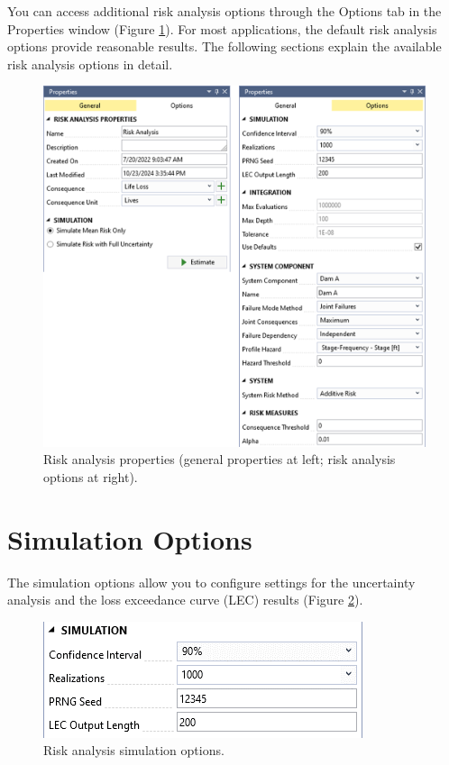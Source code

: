 \documentclass[
]{book}
\begin{document}
You can access additional risk analysis options through the Options tab in the Properties window (Figure \ref{fig:figure-124}). For most applications, the default risk analysis options provide reasonable results. The following sections explain the available risk analysis options in detail.

\begin{figure}

{\centering \includegraphics[width=0.85\linewidth]{images/figure124} 

}

\caption{Risk analysis properties (general properties at left; risk analysis options at right).}\label{fig:figure-124}
\end{figure}

\hypertarget{simulation-options}{%
\section{Simulation Options}\label{simulation-options}}

The simulation options allow you to configure settings for the uncertainty analysis and the loss exceedance curve (LEC) results (Figure \ref{fig:figure-125}).

\begin{figure}

{\centering \includegraphics{images/figure125} 

}

\caption{Risk analysis simulation options.}\label{fig:figure-125}
\end{figure}
\end{document}

